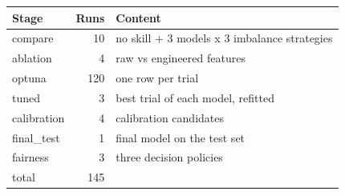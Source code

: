 \begin{tabular}{lrl}
\toprule
Stage & Runs & Content \\
\midrule
compare & 10 & no skill + 3 models x 3 imbalance strategies \\
ablation & 4 & raw vs engineered features \\
optuna & 120 & one row per trial \\
tuned & 3 & best trial of each model, refitted \\
calibration & 4 & calibration candidates \\
final\_test & 1 & final model on the test set \\
fairness & 3 & three decision policies \\
total & 145 &  \\
\bottomrule
\end{tabular}
